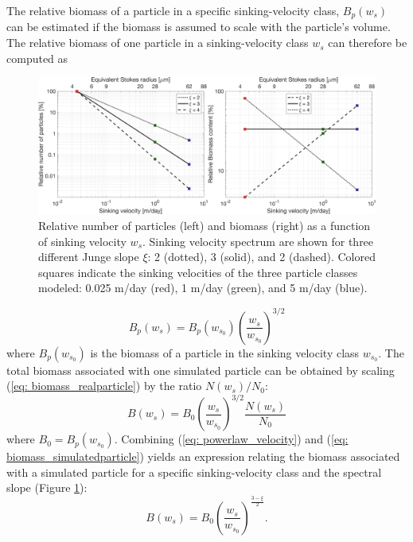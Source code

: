\documentclass[article,linenumbers]{agujournal2019}
\begin{document}
	The relative biomass of a particle in a specific sinking-velocity class, $B_p(w_s)$ can be estimated if the biomass is assumed to scale with the particle's volume. The relative biomass of one particle in a sinking-velocity class $w_s$ can therefore be computed as
	\begin{figure}[ht]
		\centering
		\includegraphics[width = \linewidth]{Fig4.png}
		\caption{Relative number of particles (left) and biomass (right) as a function of sinking velocity $w_s$. Sinking velocity spectrum are shown for three different Junge slope $\xi$: 2 (dotted), 3 (solid), and 2 (dashed). Colored squares indicate the sinking velocities of the three particle classes modeled: 0.025 m/day (red), 1 m/day (green), and 5 m/day (blue).}
		\label{fig: sinking_velocity_spectrum}
	\end{figure}
	\begin{equation}
		B_p(w_s) = B_p(w_{s_0})\left(\frac{w_s}{w_{s_0}}\right)^{3/2}
		\label{eq: biomass_realparticle}
	\end{equation}
	where $B_p(w_{s_0})$ is the biomass of a particle in the sinking velocity class $w_{s_0}$. The total biomass associated with one simulated particle can be obtained by scaling (\ref{eq: biomass_realparticle}) by the ratio $N(w_s)/N_0$:
	\begin{equation}
		B(w_s) =  B_0\left(\frac{w_s}{w_{s_0}}\right)^{3/2}\frac{N(w_s)}{N_0}
		\label{eq: biomass_simulatedparticle}
	\end{equation}
	where $B_0 = B_p(w_{s_0})$. Combining (\ref{eq: powerlaw_velocity}) and (\ref{eq: biomass_simulatedparticle}) yields an expression relating the biomass associated with a simulated particle for a specific sinking-velocity class and the spectral slope (Figure \ref{fig: sinking_velocity_spectrum}):
	\begin{equation}
		B(w_s) = B_0\left(\frac{w_s}{w_{s_0}}\right)^{\frac{3-\xi}{2}}.
		\label{eq: biomassjungeslope}
	\end{equation}
\end{document}
